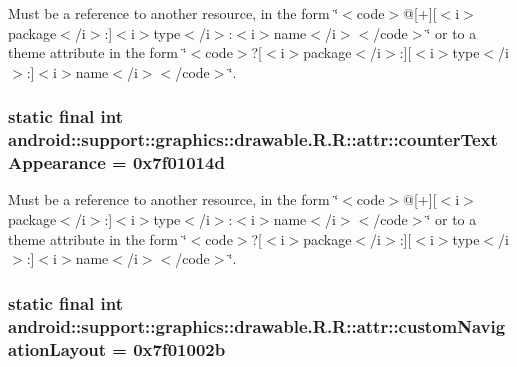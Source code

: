 Must be a reference to another resource, in the form \char`\"{}$<$code$>$@\mbox{[}+\mbox{]}\mbox{[}$<$i$>$package$<$/i$>$:\mbox{]}$<$i$>$type$<$/i$>$:$<$i$>$name$<$/i$>$$<$/code$>$\char`\"{} or to a theme attribute in the form \char`\"{}$<$code$>$?\mbox{[}$<$i$>$package$<$/i$>$:\mbox{]}\mbox{[}$<$i$>$type$<$/i$>$:\mbox{]}$<$i$>$name$<$/i$>$$<$/code$>$\char`\"{}. \hypertarget{classandroid_1_1support_1_1graphics_1_1drawable_1_1_r_1_1attr_b9d0fc649a447331efba7b2f2780897b}{
\subsubsection[{counterTextAppearance}]{\setlength{\rightskip}{0pt plus 5cm}static final int android::support::graphics::drawable.R.R::attr::counterTextAppearance = 0x7f01014d}}
\label{classandroid_1_1support_1_1graphics_1_1drawable_1_1_r_1_1attr_b9d0fc649a447331efba7b2f2780897b}


Must be a reference to another resource, in the form \char`\"{}$<$code$>$@\mbox{[}+\mbox{]}\mbox{[}$<$i$>$package$<$/i$>$:\mbox{]}$<$i$>$type$<$/i$>$:$<$i$>$name$<$/i$>$$<$/code$>$\char`\"{} or to a theme attribute in the form \char`\"{}$<$code$>$?\mbox{[}$<$i$>$package$<$/i$>$:\mbox{]}\mbox{[}$<$i$>$type$<$/i$>$:\mbox{]}$<$i$>$name$<$/i$>$$<$/code$>$\char`\"{}. \hypertarget{classandroid_1_1support_1_1graphics_1_1drawable_1_1_r_1_1attr_ed0fc2c89f4f357e9f1b212ecb59870d}{
\subsubsection[{customNavigationLayout}]{\setlength{\rightskip}{0pt plus 5cm}static final int android::support::graphics::drawable.R.R::attr::customNavigationLayout = 0x7f01002b}}
\label{classandroid_1_1support_1_1graphics_1_1drawable_1_1_r_1_1attr_ed0fc2c89f4f357e9f1b212ecb59870d}


